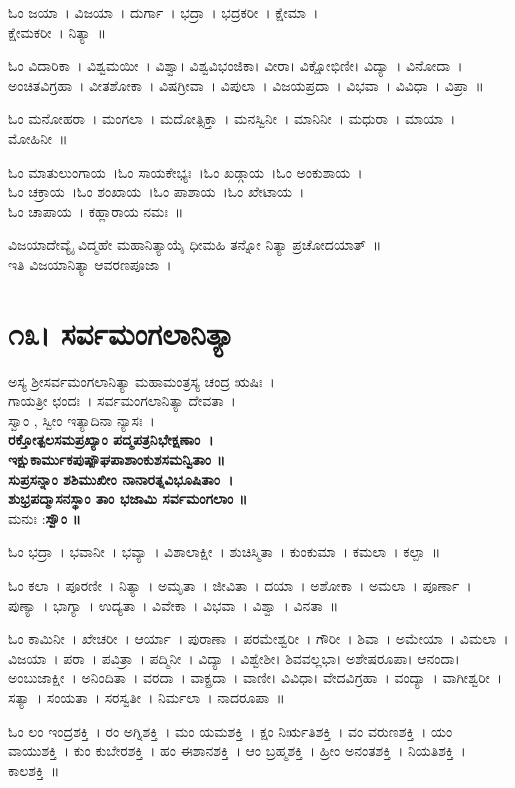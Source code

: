 ಓಂ ಜಯಾ~।  ವಿಜಯಾ~।  ದುರ್ಗಾ~।  ಭದ್ರಾ~।  ಭದ್ರಕರೀ~।  ಕ್ಷೇಮಾ~।  \\ಕ್ಷೇಮಕರೀ~।  ನಿತ್ಯಾ~॥ 

ಓಂ ವಿದಾರಿಕಾ~।  ವಿಶ್ವಮಯೀ~।  ವಿಶ್ವಾ।  ವಿಶ್ವವಿಭಂಜಿಕಾ।  ವೀರಾ। ವಿಕ್ಷೋಭಿಣೀ।  ವಿದ್ಯಾ~।  ವಿನೋದಾ~।  ಅಂಚಿತವಿಗ್ರಹಾ~।  ವೀತಶೋಕಾ~।  ವಿಷಗ್ರೀವಾ~।  ವಿಪುಲಾ~।  ವಿಜಯಪ್ರದಾ~।  ವಿಭವಾ~।  ವಿವಿಧಾ~।  ವಿಪ್ರಾ~॥ 

ಓಂ ಮನೋಹರಾ~।  ಮಂಗಲಾ~।  ಮದೋತ್ಸಿಕ್ತಾ~।  ಮನಸ್ವಿನೀ~।  ಮಾನಿನೀ~।  ಮಧುರಾ~।  ಮಾಯಾ~।  ಮೋಹಿನೀ~॥ 

ಓಂ ಮಾತುಲುಂಗಾಯ~।ಓಂ ಸಾಯಕೇಭ್ಯಃ~।ಓಂ ಖಡ್ಗಾಯ~।ಓಂ ಅಂಕುಶಾಯ~।\\ಓಂ ಚಕ್ರಾಯ~।ಓಂ ಶಂಖಾಯ~।ಓಂ ಪಾಶಾಯ~।ಓಂ ಖೇಟಾಯ~।\\ಓಂ ಚಾಪಾಯ~।  ಕಹ್ಲಾರಾಯ ನಮಃ~॥

ವಿಜಯಾದೇವ್ಯೈ ವಿದ್ಮಹೇ ಮಹಾನಿತ್ಯಾಯೈ ಧೀಮಹಿ ತನ್ನೋ ನಿತ್ಯಾ ಪ್ರಚೋದಯಾತ್~॥\\
ಇತಿ ವಿಜಯಾನಿತ್ಯಾ ಆವರಣಪೂಜಾ~।
\section{೧೩। ಸರ್ವಮಂಗಲಾನಿತ್ಯಾ}
ಅಸ್ಯ ಶ್ರೀಸರ್ವಮಂಗಲಾನಿತ್ಯಾ ಮಹಾಮಂತ್ರಸ್ಯ ಚಂದ್ರ ಋಷಿಃ~।\\ ಗಾಯತ್ರೀ ಛಂದಃ~। ಸರ್ವಮಂಗಲಾನಿತ್ಯಾ ದೇವತಾ~।\\
ಸ್ವಾಂ , ಸ್ವೀಂ ಇತ್ಯಾದಿನಾ ನ್ಯಾಸಃ~।\\
{\bfseries ರಕ್ತೋತ್ಪಲಸಮಪ್ರಖ್ಯಾಂ ಪದ್ಮಪತ್ರನಿಭೇಕ್ಷಣಾಂ~।\\
ಇಕ್ಷುಕಾರ್ಮುಕಪುಷ್ಪೌಘಪಾಶಾಂಕುಶಸಮನ್ವಿತಾಂ ॥\\
ಸುಪ್ರಸನ್ನಾಂ ಶಶಿಮುಖೀಂ ನಾನಾರತ್ನವಿಭೂಷಿತಾಂ~।\\
ಶುಭ್ರಪದ್ಮಾಸನಸ್ಥಾಂ ತಾಂ ಭಜಾಮಿ ಸರ್ವಮಂಗಲಾಂ ॥\\}
ಮನುಃ :{\bfseries  ಸ್ವೌಂ ॥}

ಓಂ ಭದ್ರಾ~।  ಭವಾನೀ~।  ಭವ್ಯಾ~।  ವಿಶಾಲಾಕ್ಷೀ~।  ಶುಚಿಸ್ಮಿತಾ~।  ಕುಂಕುಮಾ~।  ಕಮಲಾ~।  ಕಲ್ಪಾ~॥ 

ಓಂ ಕಲಾ~।  ಪೂರಣೀ~।  ನಿತ್ಯಾ~।  ಅಮೃತಾ~।  ಜೀವಿತಾ~।  ದಯಾ~।  ಅಶೋಕಾ~।  ಅಮಲಾ~।  ಪೂರ್ಣಾ~।  ಪುಣ್ಯಾ~।  ಭಾಗ್ಯಾ~।  ಉದ್ಯತಾ~।  ವಿವೇಕಾ~।  ವಿಭವಾ~।  ವಿಶ್ವಾ~।  ವಿನತಾ~॥ 

ಓಂ ಕಾಮಿನೀ~।  ಖೇಚರೀ~।  ಆರ್ಯಾ~।  ಪುರಾಣಾ~।  ಪರಮೇಶ್ವರೀ~।  ಗೌರೀ~।  ಶಿವಾ~।  ಅಮೇಯಾ~।  ವಿಮಲಾ~।  ವಿಜಯಾ~।  ಪರಾ~।  ಪವಿತ್ರಾ~।  ಪದ್ಮಿನೀ~।  ವಿದ್ಯಾ~।  ವಿಶ್ವೇಶೀ। ಶಿವವಲ್ಲಭಾ।  ಅಶೇಷರೂಪಾ।  ಆನಂದಾ।  ಅಂಬುಜಾಕ್ಷೀ~।  ಅನಿಂದಿತಾ~।  ವರದಾ~।  ವಾಕ್ಪ್ರದಾ~।  ವಾಣೀ।  ವಿವಿಧಾ।  ವೇದವಿಗ್ರಹಾ~।  ವಂದ್ಯಾ~।  ವಾಗೀಶ್ವರೀ~।  ಸತ್ಯಾ~।  ಸಂಯತಾ~।  ಸರಸ್ವತೀ~।  ನಿರ್ಮಲಾ~।  ನಾದರೂಪಾ~॥ 

ಓಂ ಲಂ ಇಂದ್ರಶಕ್ತಿ~।  ರಂ ಅಗ್ನಿಶಕ್ತಿ~।  ಮಂ ಯಮಶಕ್ತಿ~।  ಕ್ಷಂ ನಿರ್ಋತಿಶಕ್ತಿ~।  ವಂ ವರುಣಶಕ್ತಿ~।  ಯಂ ವಾಯುಶಕ್ತಿ~।  ಕುಂ ಕುಬೇರಶಕ್ತಿ~।  ಹಂ ಈಶಾನಶಕ್ತಿ~।  ಆಂ ಬ್ರಹ್ಮಶಕ್ತಿ~।  ಹ್ರೀಂ ಅನಂತಶಕ್ತಿ~।  ನಿಯತಿಶಕ್ತಿ~।  ಕಾಲಶಕ್ತಿ~॥ 

